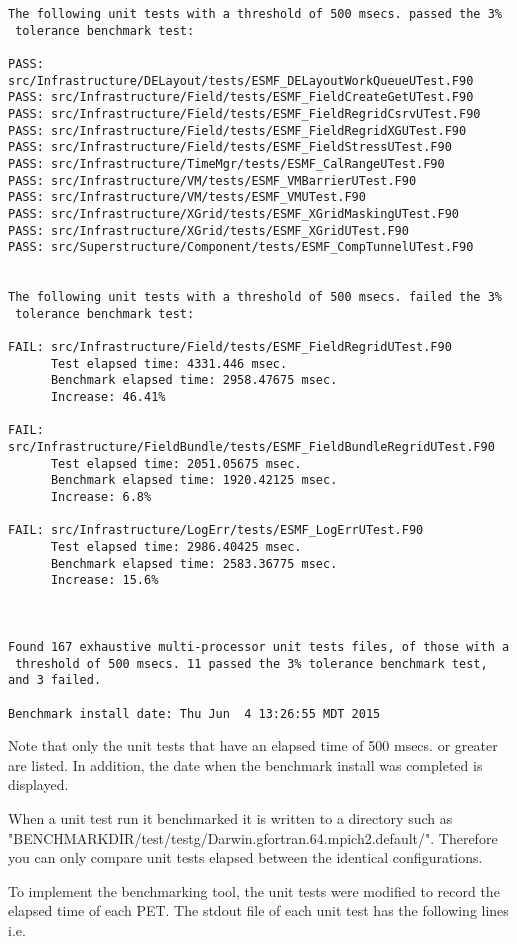 \begin{verbatim} 



The following unit tests with a threshold of 500 msecs. passed the 3% 
 tolerance benchmark test:

PASS: src/Infrastructure/DELayout/tests/ESMF_DELayoutWorkQueueUTest.F90
PASS: src/Infrastructure/Field/tests/ESMF_FieldCreateGetUTest.F90
PASS: src/Infrastructure/Field/tests/ESMF_FieldRegridCsrvUTest.F90
PASS: src/Infrastructure/Field/tests/ESMF_FieldRegridXGUTest.F90
PASS: src/Infrastructure/Field/tests/ESMF_FieldStressUTest.F90
PASS: src/Infrastructure/TimeMgr/tests/ESMF_CalRangeUTest.F90
PASS: src/Infrastructure/VM/tests/ESMF_VMBarrierUTest.F90
PASS: src/Infrastructure/VM/tests/ESMF_VMUTest.F90
PASS: src/Infrastructure/XGrid/tests/ESMF_XGridMaskingUTest.F90
PASS: src/Infrastructure/XGrid/tests/ESMF_XGridUTest.F90
PASS: src/Superstructure/Component/tests/ESMF_CompTunnelUTest.F90


The following unit tests with a threshold of 500 msecs. failed the 3% 
 tolerance benchmark test:

FAIL: src/Infrastructure/Field/tests/ESMF_FieldRegridUTest.F90
      Test elapsed time: 4331.446 msec.
      Benchmark elapsed time: 2958.47675 msec.
      Increase: 46.41%

FAIL: src/Infrastructure/FieldBundle/tests/ESMF_FieldBundleRegridUTest.F90
      Test elapsed time: 2051.05675 msec.
      Benchmark elapsed time: 1920.42125 msec.
      Increase: 6.8%

FAIL: src/Infrastructure/LogErr/tests/ESMF_LogErrUTest.F90
      Test elapsed time: 2986.40425 msec.
      Benchmark elapsed time: 2583.36775 msec.
      Increase: 15.6%



Found 167 exhaustive multi-processor unit tests files, of those with a 
 threshold of 500 msecs. 11 passed the 3% tolerance benchmark test, and 3 failed.

Benchmark install date: Thu Jun  4 13:26:55 MDT 2015

\end{verbatim}

Note that only the unit tests that have an elapsed time of 500 msecs. or greater are listed. In addition, the date when
the benchmark install was completed is displayed.

\begin{sloppypar}
When a unit test run it benchmarked it is written to a directory such as 
 "BENCHMARKDIR/test/testg/Darwin.gfortran.64.mpich2.default/".
Therefore you can only compare unit tests elapsed between the identical configurations. 

To implement the benchmarking tool, the unit tests were modified to record the elapsed time of each PET.
The stdout file of each unit test has the following lines i.e.
\end{sloppypar}

